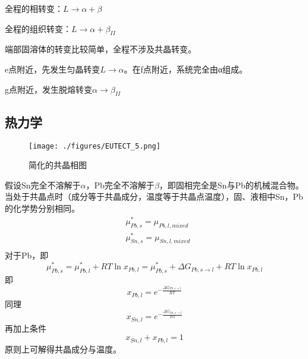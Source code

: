 全程的相转变：$L \rightarrow \alpha+\beta$

全程的组织转变：$L \rightarrow \alpha+ \beta_{II}$

端部固溶体的转变比较简单，全程不涉及共晶转变。

e点附近，先发生匀晶转变$L \rightarrow \alpha$。在f点附近，系统完全由α组成。

g点附近，发生脱熔转变$\alpha \rightarrow \beta_{II}$

\subsection{热力学}
\begin{figure}[ht]
\centering
\texttt{[image: ./figures/EUTECT\_5.png]}
\caption{简化的共晶相图} \label{EUTECT_fig5}
\end{figure}
假设Sn完全不溶解于$\alpha$，Pb完全不溶解于$\beta$，即固相完全是Sn与Pb的机械混合物。当处于共晶点时（成分等于共晶成分，温度等于共晶点温度），固、液相中Sn，Pb的化学势分别相同。
\begin{align}
&\mu_{Pb,s}^*=\mu_{Pb,l,mixed}\\
&\mu_{Sn,s}^*=\mu_{Sn,l,mixed}\\
\end{align}
对于Pb，即
$$\mu_{Pb,s}^*=\mu_{Pb,l}^*+RT \ln x_{Pb,l}=\mu_{Pb,s}^*+\Delta G_{Pb, s\rightarrow l}+RT \ln x_{Pb,l}$$
即
\begin{equation}
x_{Pb,l}=e^{-\frac{\Delta G_{Pb, s\rightarrow l}}{RT}}
\end{equation}
同理
\begin{equation}
x_{Sn,l}=e^{-\frac{\Delta G_{Sn, s\rightarrow l}}{RT}}
\end{equation}
再加上条件
\begin{equation}
x_{Sn,l}+x_{Pb,l}=1
\end{equation}
原则上可解得共晶成分与温度。
